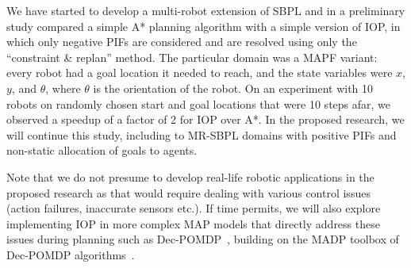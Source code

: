 \documentclass[11pt]{article}
\begin{document}
We have started to develop a multi-robot extension of SBPL and in a preliminary study compared a simple A* planning algorithm with a simple version of IOP, in which only negative PIFs are considered and are resolved using only the ``constraint \& replan''  method. The particular domain was a MAPF variant: every robot had a goal location it needed to reach, and the state variables were $x$, $y$, and $\theta$, where $\theta$ is the orientation of the robot. On an experiment with 10 robots on randomly chosen start and goal locations that were 10 steps afar, we observed a speedup of a factor of 2 for IOP over A*. In the proposed research, we will continue this study, including to MR-SBPL domains with positive PIFs and non-static allocation of goals to agents.



Note that we do not presume to develop real-life robotic applications in the proposed research as that would require dealing with various control issues (action failures, inaccurate sensors etc.). If time permits, we will also explore implementing IOP in more complex MAP models that directly address these issues during planning such as Dec-POMDP~\cite{bernstein2002complexity}, building on the MADP toolbox of Dec-POMDP algorithms~\cite{MADPToolbox-0.3.1}.
\end{document}
